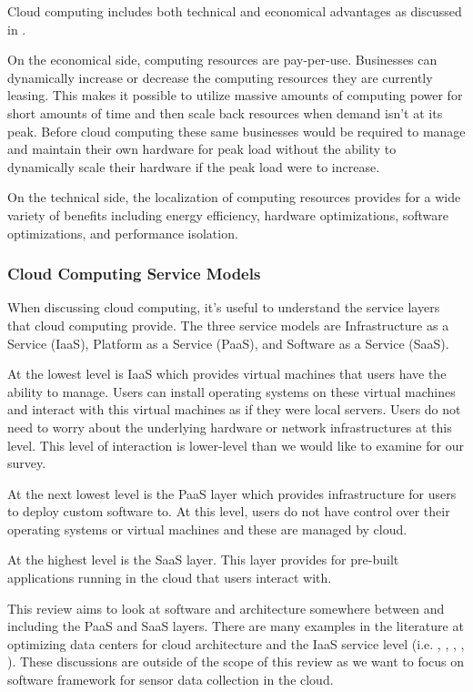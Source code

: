 \documentclass[twocolumn]{article}
\begin{document}
Cloud computing includes both technical and economical advantages as discussed in \cite{botta_integration_2016}. 

On the economical side, computing resources are pay-per-use. Businesses can dynamically increase or decrease the computing resources they are currently leasing. This makes it possible to utilize massive amounts of computing power for short amounts of time and then scale back resources when demand isn't at its peak. Before cloud computing these same businesses would be required to manage and maintain their own hardware for peak load without the ability to dynamically scale their hardware if the peak load were to increase.

On the technical side, the localization of computing resources provides for a wide variety of benefits including energy efficiency, hardware optimizations, software optimizations, and performance isolation. 

\subsubsection{Cloud Computing Service Models}
When discussing cloud computing, it's useful to understand the service layers that cloud computing provide. The three service models are Infrastructure as a Service (IaaS), Platform as a Service (PaaS), and Software as a Service (SaaS).

At the lowest level is IaaS which provides virtual machines that users have the ability to manage. Users can install operating systems on these virtual machines and interact with this virtual machines as if they were local servers. Users do not need to worry about the underlying hardware or network infrastructures at this level. This level of interaction is lower-level than we would like to examine for our survey. 

At the next lowest level is the PaaS layer which provides infrastructure for users to deploy custom software to. At this level, users do not have control over their operating systems or virtual machines and these are managed by cloud. 

At the highest level is the SaaS layer. This layer provides for pre-built applications running in the cloud that users interact with.

This review aims to look at software and architecture somewhere between and including the PaaS and SaaS layers. There are many examples in the literature at optimizing data centers for cloud architecture and the IaaS service level (i.e. \cite{khanghahi_new_2014}, \cite{wang_survey_2015}, \cite{shen_cloudscale_2011}, \cite{qi_sierpinski_2014}, \cite{khethavath_towards_2016}). These discussions are outside of the scope of this review as we want to focus on software framework for sensor data collection in the cloud.
\end{document}
